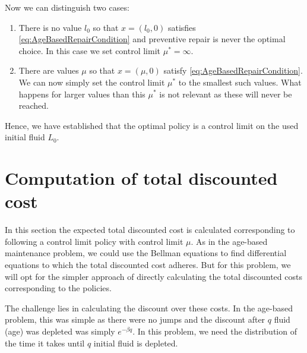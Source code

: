 \documentclass[a4paper]{thesis}
\theoremstyle{definition}
\begin{document}
Now we can distinguish two cases:
\begin{enumerate}
	\item There is no value $l_0$ so that $x=(l_0,0)$ satisfies \eqref{eq:AgeBasedRepairCondition} and preventive repair is never the optimal choice.
	In this case we set control limit $\mu^*=\infty$.
	\item There are values $\mu$ so that $x=(\mu,0)$ satisfy \eqref{eq:AgeBasedRepairCondition}.
	We can now simply set the control limit $\mu^*$ to the smallest such values.
	What happens for larger values than this $\mu^*$ is not relevant as these will never be reached.
\end{enumerate}
Hence, we have established that the optimal policy is a control limit on the used initial fluid $L_0$. \section{Computation of total discounted cost}
In this section the expected total discounted cost is calculated corresponding to following a control limit policy with control limit $\mu$.
As in the age-based maintenance problem, we could use the Bellman equations to find differential equations to which the total discounted cost adheres.
But for this problem, we will opt for the simpler approach of directly calculating the total discounted costs corresponding to the policies.

The challenge lies in calculating the discount over these costs.
In the age-based problem, this was simple as there were no jumps and the discount after $q$ fluid (age) was depleted was simply $e^{-\beta q}$.
In this problem, we need the distribution of the time it takes until $q$ initial fluid is depleted.
\end{document}

